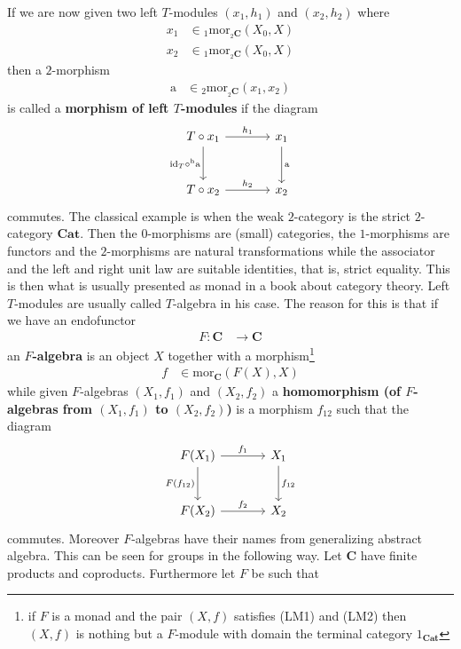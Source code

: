 If we are now given two left $T$-modules $(x_{1},h_{1})$ and $(x_{2},h_{2})$ where
\begin{align*}
  x_{1}
  &\in
  {}_{1}\mathrm{mor}_{{}_{2}\mathbf{C}}(X_{0},X)
  \\
  x_{2}
  &\in
  {}_{1}\mathrm{mor}_{{}_{2}\mathbf{C}}(X_{0},X)
\end{align*}
then a $2$-morphism
\begin{align*}
  \mathrm{a}
  &\in
  {}_{2}\mathrm{mor}_{{}_{2}\mathbf{C}}(x_{1},x_{2})
\end{align*}
is called a \textbf{morphism of left $T$-modules} if the diagram
\[
\begin{tikzcd}[sep=large]
  T
  \circ
  x_{1}
  \arrow{r}{h_{1}}
  \arrow[swap]{d}{\mathrm{id}_{T} \circ^{\textrm{h}} \mathrm{a}}
  &
  x_{1}
  \arrow{d}{\mathrm{a}}
  \\
  T
  \circ
  x_{2}
  \arrow{r}{h_{2}}
  &
  x_{2}
\end{tikzcd}
\]
commutes. The classical example is when the weak $2$-category is the strict $2$-category $\mathbf{Cat}$. Then the $0$-morphisms are (small) categories, the $1$-morphisms are functors and the $2$-morphisms are natural transformations while the associator and the left and right unit law are suitable identities, that is, strict equality. This is then what is usually presented as monad in a book about category theory. Left $T$-modules are usually called $T$-algebra in his case. The reason for this is that if we have an endofunctor
\begin{align*}
  F
  \colon
  \mathbf{C}
  &\rightarrow
  \mathbf{C}
\end{align*}
an \textbf{$F$-algebra} is an object $X$ together with a morphism\footnote{if $F$ is a monad and the pair $(X,f)$ satisfies (LM1) and (LM2) then $(X,f)$ is nothing but a $F$-module with domain the terminal category $1_{\mathbf{Cat}}$}
\begin{align*}
  f
  &\in
  \mathrm{mor}_{\mathbf{C}}(F(X),X)
\end{align*}
while given $F$-algebras $(X_{1},f_{1})$ and $(X_{2},f_{2})$ a \textbf{homomorphism (of $F$-algebras from $(X_{1},f_{1})$ to $(X_{2},f_{2})$)} is a morphism $f_{12}$ such that the diagram
\[
\begin{tikzcd}[sep=large]
  F(X_{1})
  \arrow{r}{f_{1}}
  \arrow[swap]{d}{F(f_{12})}
  &
  X_{1}
  \arrow{d}{f_{12}}
  \\
  F(X_{2})
  \arrow{r}{f_{2}}
  &
  X_{2}
\end{tikzcd}
\]
commutes. Moreover $F$-algebras have their names from generalizing abstract algebra. This can be seen for groups in the following way. Let $\mathbf{C}$ have finite products and coproducts. Furthermore let $F$ be such that
